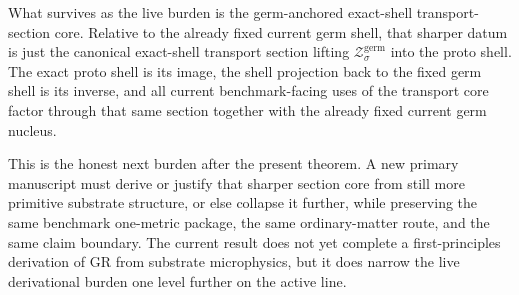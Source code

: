 \documentclass[11pt]{article}
\newcommand{\GermShell}[1]{\mathcal Z_{#1}^{\mathrm{germ}}}
\begin{document}
What survives as the live burden is the germ-anchored exact-shell transport-section core. Relative to the already fixed current germ shell, that sharper datum is just the canonical exact-shell transport section lifting \(\GermShell{\sigma}\) into the proto shell. The exact proto shell is its image, the shell projection back to the fixed germ shell is its inverse, and all current benchmark-facing uses of the transport core factor through that same section together with the already fixed current germ nucleus.

This is the honest next burden after the present theorem. A new primary manuscript must derive or justify that sharper section core from still more primitive substrate structure, or else collapse it further, while preserving the same benchmark one-metric package, the same ordinary-matter route, and the same claim boundary. The current result does not yet complete a first-principles derivation of GR from substrate microphysics, but it does narrow the live derivational burden one level further on the active line.
\end{document}
